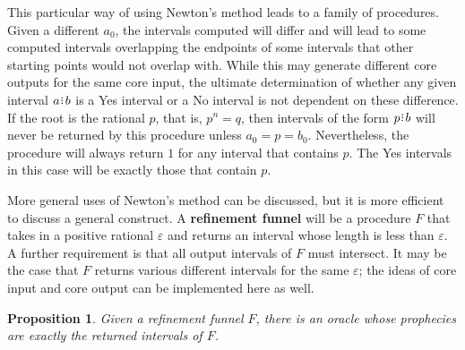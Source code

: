 \documentclass[12pt]{article}
\newtheorem{proposition}{Proposition}[section]
\begin{document}
This particular way of using Newton's method leads to a family of procedures. Given a different $a_0$, the intervals computed will differ and will lead to some computed intervals overlapping the endpoints of some intervals that other starting points would not overlap with. While this may generate different core outputs for the same core input, the ultimate determination of whether any given interval $a\rint b$ is a Yes interval or a No interval is not dependent on these difference.  If the root is the rational $p$, that is, $p^n = q$,  then intervals of the form $p\rint b$ will never be returned by this procedure unless $a_0 = p = b_0$. Nevertheless, the procedure will always return $1$ for any interval that contains $p$. The Yes intervals in this case will be exactly those that contain $p$. 

More general uses of Newton's method can be discussed, but it is more efficient to discuss a general construct. A \textbf{refinement funnel} will be a procedure $F$ that takes in a positive rational $\varepsilon$ and returns an interval whose length is less than $\varepsilon$. A further requirement is that all output intervals of $F$ must intersect. It may be the case that $F$ returns various different intervals for the same $\varepsilon$; the ideas of core input and core output can be implemented here as well. 

\begin{proposition}\label{os-linked}
    Given a refinement funnel $F$, there is an oracle whose prophecies are exactly the returned intervals of $F$. 
\end{proposition}
\end{document}
